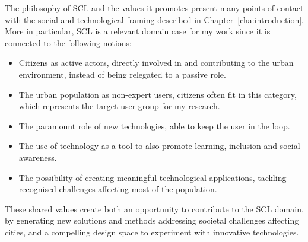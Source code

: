 The philosophy of SCL and the values it promotes present many points of contact with the social and technological framing described in Chapter~\ref{cha:introduction}. More in particular, SCL is a relevant domain case for my work since it is connected to the following notions:

\begin{itemize}
	\item Citizens as active actors, directly involved in and contributing to the urban environment, instead of being relegated to a passive role.
	\item The urban population as non-expert users, citizens often fit in this category, which represents the target user group for my research.
	\item The paramount role of new technologies, able to keep the user in the loop.
	\item The use of technology as a tool to also promote learning, inclusion and social awareness.
	\item The possibility of creating meaningful technological applications, tackling recognised challenges affecting most of the population.
\end{itemize}

These shared values create both an opportunity to contribute to the SCL domain, by generating new solutions and methods addressing societal challenges affecting cities, and a compelling design space to experiment with innovative technologies.
